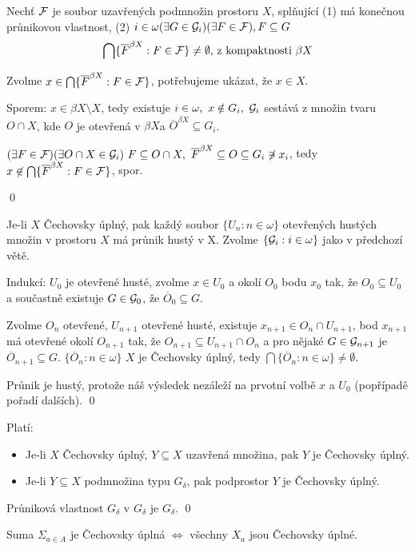 \documentclass[12pt,a4paper]{article}
\newcommand\BX{\ensuremath{\beta X}}
\newcommand\close{\overline}
\newcommand{\betaClose}[1]{\close #1 ^{\beta X}}
\begin{document}
	Nechť $\mathcal{ F }$ je soubor uzavřených podmnožin prostoru $X$, splňující (1) má
	konečnou průnikovou vlastnost, (2) $i \in \omega (\exists G \in \mathcal{ G }_i)
	(\exists F \in \mathcal{ F }), F \subseteq G$
		$$\bigcap \{\betaClose F : F \in \p F\} \neq \emptyset \text{, z
		  kompaktnosti } \beta X$$

	Zvolme $x \in \bigcap \{\betaClose F : F \in \p F\}$, potřebujeme ukázat,
	že $x \in X$.

	Sporem: $x \in \beta X \setminus X$, tedy existuje $i \in \omega,~x \notin
	G_i,~\mathcal{ G }_i$ sestává z množin tvaru $O \cap X$, kde $O$ je otevřená v \BX a
	$\betaClose O \subseteq G_i$.

	$(\exists F \in \p F) (\exists O \cap X \in \p G_i)~F \subseteq O \cap X,~
	\betaClose F \subseteq O \subseteq G_i \not\ni x_i$, tedy $x \not\in
	\bigcap \{\betaClose F : F \in \p F\}$, spor.

	\qed

\veta[Baireova] Je-li $X$ Čechovsky úplný, pak každý soubor $\{U_n : n \in
	\omega\}$ otevřených hustých množin v prostoru $X$ má průnik hustý v X.
\dukaz
	Zvolme $\{\mathcal{ G }_i : i \in \omega\}$ jako v předchozí větě.

	Indukcí: $U_0$ je otevřené husté, zvolme $x \in U_0$ a okolí $O_0$ bodu
	$x_0$ tak, že $O_0 \subseteq U_0$ a součastně existuje $G \in \mathcal{ G }_0$, že
	$\close O_0 \subseteq G$.

	Zvolme $O_n$ otevřené, $U_{n+1}$ otevřené husté, existuje $x_{n+1} \in O_n
	\cap U_{n+1}$, bod $x_{n+1}$ má otevřené okolí $O_{n+1}$ tak, že $O_{n+1}
	\subseteq U_{n+1} \cap O_n$ a pro nějaké $G \in \mathcal{ G }_{n+1}$ je $\close
	O_{n+1} \subseteq G$. $\{\close O_n : n \in \omega\}$ $X$ je Čechovsky
	úplný, tedy $\bigcap \{\close O_n : n \in \omega\} \neq \emptyset$.

	Průnik je hustý, protože náš výsledek nezáleží na prvotní volbě $x$ a $U_0$
	(popřípadě pořadí dalších).
	\qed

\veta Platí:
\begin{itemize}
	\item Je-li $X$ Čechovsky úplný, $Y \subseteq X$ uzavřená množina, pak $Y$
		je Čechovsky úplný.
	\item Je-li $Y \subseteq X$ podmnožina typu $G_\delta$, pak podprostor $Y$
		je Čechovsky úplný.
\end{itemize}
\dukaz
	Průniková vlastnost $G_\delta$ v $G_\delta$ je $G_\delta$.
	\qed

\veta Suma $\Sigma_{a \in A}$ je Čechovsky úplná $\iff$ všechny $X_a$ jsou
	Čechovsky úplné.
\end{document}
